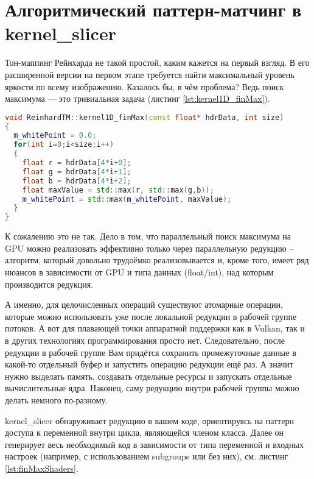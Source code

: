 \documentclass[11pt,fleqn,english,russian]{report} %
\begin{document}
\section{Алгоритмический паттерн-матчинг в kernel\_slicer}

Тон-маппинг Рейнхарда не такой простой, каким кажется на первый взгляд. В его расширенной версии на первом этапе требуется найти максимальный уровень яркости по всему изображению. Казалось бы, в чём проблема? Ведь поиск максимума --- это тривиальная задача (листинг \ref{lst:kernel1D_finMax}).

\begin{lstlisting}[language=C++, 
  	               caption=вычислительное ядро поиска максимума с алгоритмическим паттерном редукции, 
	               label=lst:kernel1D_finMax]	
void ReinhardTM::kernel1D_finMax(const float* hdrData, int size)
{
  m_whitePoint = 0.0;
  for(int i=0;i<size;i++)
  {
    float r = hdrData[4*i+0];
    float g = hdrData[4*i+1];
    float b = hdrData[4*i+2];
    float maxValue = std::max(r, std::max(g,b));
    m_whitePoint = std::max(m_whitePoint, maxValue);
  }  
}
\end{lstlisting}

К сожалению это не так. Дело в том, что параллельный поиск максимума на GPU можно реализовать эффективно только через параллельную редукцию -- алгоритм, который довольно трудоёмко реализовывается и, кроме того, имеет ряд нюансов в зависимости от GPU и типа данных (float/int), над которым производится редукция. 

А именно, для целочисленных операций существуют атомарные операции, которые можно использовать уже после локальной редукции в рабочей группе потоков. А вот для плавающей точки аппаратной поддержки как в Vulkan, так и в других технологиях программирования просто нет. Следовательно, после редукции в рабочей группе Вам придётся сохранить промежуточные данные в какой-то отдельный буфер и запустить операцию редукции ещё раз. А значит нужно выделать память, создавать отдельные ресурсы и запускать отдельные вычислительные ядра. Наконец, саму редукцию внутри рабочей группы можно делать немного по-разному.

kernel\_slicer обнаруживает редукцию в вашем коде, ориентируясь на паттерн доступа к переменной внутри цикла, являющейся членом класса. Далее он генерирует весь необходимый код в зависимости от типа переменной и входных настроек (например, с использованием subgroups или без них), см. листинг \ref{lst:finMaxShaders}.
\end{document}
